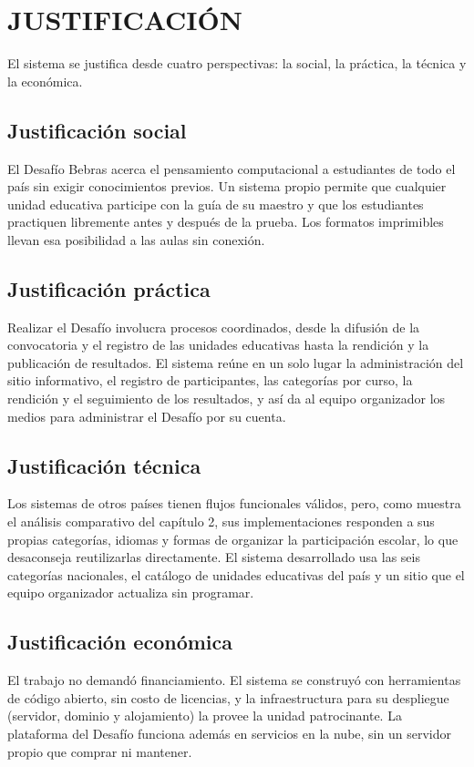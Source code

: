 
\section{JUSTIFICACIÓN}

El sistema se justifica desde cuatro perspectivas: la social, la práctica, la técnica y la económica.

\subsection{Justificación social}

El Desafío Bebras acerca el pensamiento computacional a estudiantes de todo el país sin exigir conocimientos previos. Un sistema propio permite que cualquier unidad educativa participe con la guía de su maestro y que los estudiantes practiquen libremente antes y después de la prueba. Los formatos imprimibles llevan esa posibilidad a las aulas sin conexión.

\subsection{Justificación práctica}

Realizar el Desafío involucra procesos coordinados, desde la difusión de la convocatoria y el registro de las unidades educativas hasta la rendición y la publicación de resultados. El sistema reúne en un solo lugar la administración del sitio informativo, el registro de participantes, las categorías por curso, la rendición y el seguimiento de los resultados, y así da al equipo organizador los medios para administrar el Desafío por su cuenta.

\subsection{Justificación técnica}

Los sistemas de otros países tienen flujos funcionales válidos, pero, como muestra el análisis comparativo del capítulo 2, sus implementaciones responden a sus propias categorías, idiomas y formas de organizar la participación escolar, lo que desaconseja reutilizarlas directamente. El sistema desarrollado usa las seis categorías nacionales, el catálogo de unidades educativas del país y un sitio que el equipo organizador actualiza sin programar.

\subsection{Justificación económica}

El trabajo no demandó financiamiento. El sistema se construyó con herramientas de código abierto, sin costo de licencias, y la infraestructura para su despliegue (servidor, dominio y alojamiento) la provee la unidad patrocinante. La plataforma del Desafío funciona además en servicios en la nube, sin un servidor propio que comprar ni mantener.
